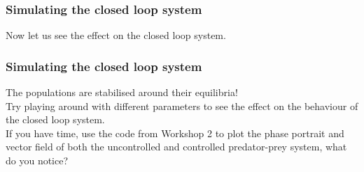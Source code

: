 \documentclass[9pt]{beamer-control}
\begin{document}
\begin{frame}
	\frametitle{Simulating the closed loop system}
	Now let us see the effect on the closed loop system.
\end{frame}


\begin{frame}
	\frametitle{Simulating the closed loop system}
	The populations are stabilised around their equilibria! \\[15pt]
Try playing around with different parameters to see the effect on the behaviour of the closed loop system. \\[15pt]
If you have time, use the code from Workshop 2 to plot the phase portrait and vector field of both the uncontrolled and controlled predator-prey system, what do you notice?
\end{frame}
\end{document}
